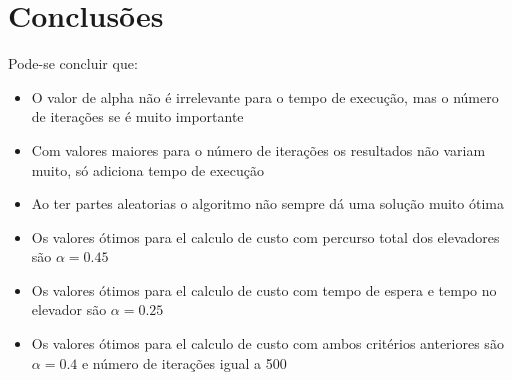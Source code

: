 \section{Conclusões}
	Pode-se concluir que:
	\begin{itemize}
		\item O valor de alpha não é irrelevante para o tempo de execução, mas o número de iterações se é muito importante
		\item Com valores maiores para o número de iterações os resultados não variam muito, só adiciona tempo de execução
		\item Ao ter partes aleatorias o algoritmo não sempre dá uma solução muito ótima 
		\item Os valores ótimos para el calculo de custo com percurso total dos elevadores são $\alpha = 0.45$
		\item Os valores ótimos para el calculo de custo com tempo de espera e tempo no elevador são $\alpha = 0.25$
		\item Os valores ótimos para el calculo de custo com ambos critérios anteriores são $\alpha = 0.4$ e número de iterações igual a 500
	\end{itemize}
	
\clearpage